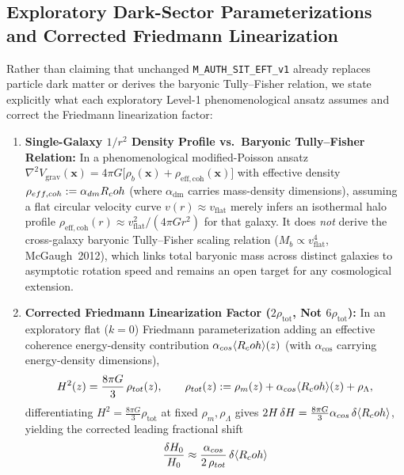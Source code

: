 \subsection{Exploratory Dark-Sector Parameterizations and Corrected Friedmann Linearization}
\label{sec:darkmatter}

Rather than claiming that unchanged \texttt{M\_AUTH\_SIT\_EFT\_v1} already replaces particle dark matter or derives the baryonic Tully--Fisher relation, we state explicitly what each exploratory Level-1 phenomenological ansatz assumes and correct the Friedmann linearization factor:
\begin{enumerate}[leftmargin=2em]
  \item \textbf{Single-Galaxy $1/r^2$ Density Profile vs.\ Baryonic Tully--Fisher Relation:} In a phenomenological modified-Poisson ansatz $\nabla^2 V_{\mathrm{grav}}(\mathbf{x}) = 4\pi G\bigl[\rho_b(\mathbf{x}) + \rho_{\mathrm{eff,coh}}(\mathbf{x})\bigr]$ with effective density $\rho_{eff,coh} := \alpha_{dm}R_coh$ (where $\alpha_{\mathrm{dm}}$ carries mass-density dimensions), assuming a flat circular velocity curve $v(r) \approx v_{\mathrm{flat}}$ merely infers an isothermal halo profile $\rho_{\mathrm{eff,coh}}(r) \approx v_{\mathrm{flat}}^2/(4\pi G r^2)$ for that galaxy. It does \emph{not} derive the cross-galaxy baryonic Tully--Fisher scaling relation ($M_b \propto v_{\mathrm{flat}}^4$, McGaugh~2012), which links total baryonic mass across distinct galaxies to asymptotic rotation speed and remains an open target for any cosmological extension.
  \item \textbf{Corrected Friedmann Linearization Factor ($2\rho_{\mathrm{tot}}$, Not $6\rho_{\mathrm{tot}}$):} In an exploratory flat ($k = 0$) Friedmann parameterization adding an effective coherence energy-density contribution $\alpha_{cos}\langle R_coh\rangle(z)$ (with $\alpha_{\mathrm{cos}}$ carrying energy-density dimensions),
  \begin{equation}
  H^2(z) = \frac{8\pi G}{3}\,\rho_{tot}(z),
  \qquad
  \rho_{tot}(z) := \rho_m(z) + \alpha_{cos}\langle R_coh\rangle(z) + \rho_\Lambda,
  \label{eq:friedmann_exploratory}
  \end{equation}
  differentiating $H^2 = \frac{8\pi G}{3}\rho_{\mathrm{tot}}$ at fixed $\rho_m, \rho_\Lambda$ gives $2H\,\delta H = \frac{8\pi G}{3}\alpha_{cos}\,\delta\langle R_coh\rangle$, yielding the corrected leading fractional shift
  \begin{equation}
  \frac{\delta H_0}{H_0} \approx \frac{\alpha_{\mathrm{cos}}}{2\,\rho_{\mathrm{tot}}}\,\delta\langle\Rcoh\rangle

\end{equation}
\end{enumerate}
